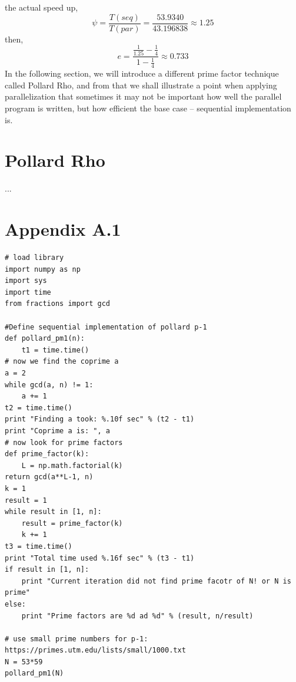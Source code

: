 \documentclass[10pt]{article}
\begin{document}
the actual speed up,\begin{equation*}
\psi = \frac{T(seq)}{T(par)}=\frac{53.9340}{43.196838} \approx 1.25
\end{equation*}
then,
\begin{equation*}
e = \frac{\frac{1}{1.25}-\frac{1}{4}}{1-\frac{1}{4}} \approx 0.733
\end{equation*}
In the following section, we will introduce a different prime factor technique called Pollard Rho, and from that we shall illustrate a point when applying parallelization that sometimes it may not be important how well the parallel program is written, but how efficient the base case -- sequential implementation is.

\section{Pollard Rho}
...


























\newpage
\section*{Appendix A.1}
\begin{verbatim}
# load library
import numpy as np
import sys
import time
from fractions import gcd

#Define sequential implementation of pollard p-1
def pollard_pm1(n):
    t1 = time.time()
# now we find the coprime a
a = 2
while gcd(a, n) != 1:
    a += 1
t2 = time.time()
print "Finding a took: %.10f sec" % (t2 - t1)
print "Coprime a is: ", a
# now look for prime factors
def prime_factor(k):
    L = np.math.factorial(k)
return gcd(a**L-1, n)
k = 1
result = 1
while result in [1, n]:
    result = prime_factor(k)
    k += 1
t3 = time.time()
print "Total time used %.16f sec" % (t3 - t1)
if result in [1, n]:
    print "Current iteration did not find prime facotr of N! or N is prime"
else:
    print "Prime factors are %d ad %d" % (result, n/result)

# use small prime numbers for p-1: https://primes.utm.edu/lists/small/1000.txt
N = 53*59
pollard_pm1(N)
\end{verbatim}
\end{document}
